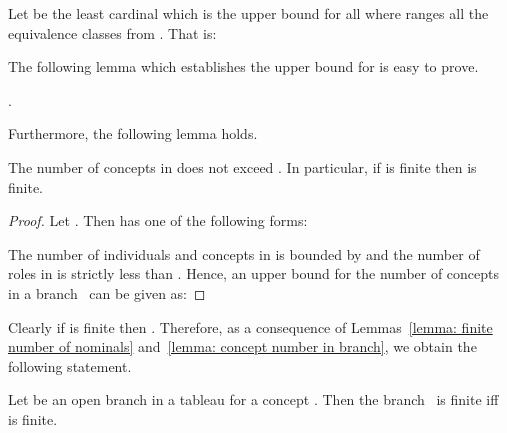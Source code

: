 \documentclass[leqno
,pdflatex
,prodmode
,acmtocl
]{acmsmall}
\begin{document}
Let  be the least cardinal 
which is the upper bound for all  
where  ranges all the equivalence classes from .
That is:

The following lemma which establishes the upper bound for  is easy to prove.

\begin{lemma}\label{lemma: finite number of nominals}
.
\end{lemma}
Furthermore, the following lemma holds.
\begin{lemma}\label{lemma: concept number in branch}
The number of concepts in  does not exceed .
In particular, if  is finite then  is finite.
\end{lemma}
\begin{proof}
Let . Then 
has one of the following forms:

The number of individuals and concepts in  is bounded by 
and the number of roles in  is strictly less than .
Hence, an upper bound for the number of concepts in a branch~
can be given as:

\end{proof}
Clearly if  is finite then 
.
Therefore, as a consequence of Lemmas~\ref{lemma: finite number of nominals} and~\ref{lemma: concept number in branch},
we obtain the following statement.
\begin{corollary}\label{corollary: branch finiteness criterion}
Let  be an open branch in a  tableau for a concept .
Then the branch~ is finite iff  is finite.
\end{corollary}
\end{document}
